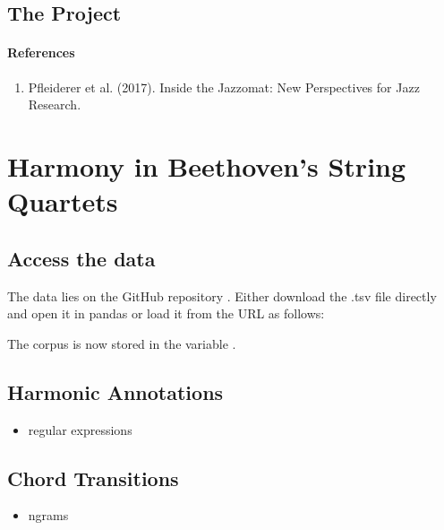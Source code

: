 \documentclass[letterpaper,10pt,english]{sphinxmanual}
\begin{document}
\section{The Project}
\label{\detokenize{jazz_solos:the-project}}\subsubsection*{References}
\begin{enumerate}
%
\item {} 
Pfleiderer et al. (2017). Inside the Jazzomat: New Perspectives for Jazz Research.

\end{enumerate}


\chapter{Harmony in Beethoven’s String Quartets}
\label{\detokenize{beethoven_harmony:harmony-in-beethoven-s-string-quartets}}\label{\detokenize{beethoven_harmony::doc}}

\section{Access the data}
\label{\detokenize{beethoven_harmony:access-the-data}}
The data lies on the GitHub repository .
Either download the .tsv file directly and open it in pandas or load it from the URL as follows:

\begin{sphinxVerbatim}[commandchars=\\\{\}]
   

   
\end{sphinxVerbatim}

The corpus is now stored in the variable .


\section{Harmonic Annotations}
\label{\detokenize{beethoven_harmony:harmonic-annotations}}\begin{itemize}
\item {} 
regular expressions

\end{itemize}


\section{Chord Transitions}
\label{\detokenize{beethoven_harmony:chord-transitions}}\begin{itemize}
\item {} 
n\sphinxhyphen{}grams

\end{itemize}



\renewcommand{\indexname}{Index}
\printindex
\end{document}
